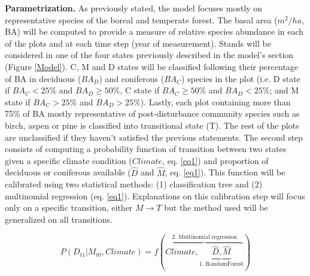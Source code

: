 \textbf{Parametrization.} As previously stated, the model focuses mostly on
representative species of the boreal and temperate forest. The basal area
($m^2/ha$, BA) will be computed to provide a measure of relative species
abundance in each of the plots and at each time step (year of measurement).
Stands will be considered in one of the four states previously described in
the model's section (Figure \ref{Model}). C, M and D states will be classified
following their percentage of BA in deciduous ($BA_D$) and coniferous ($BA_C$)
species in the plot (i.e. D state if $BA_C < 25\%$ and $BA_D \geq 50\%$, C
state if ${BA}_C \geq 50\%$ and $BA_D < 25\%$; and M state if $BA_C > 25\%$
and $BA_D > 25\%$). Lastly, each plot containing more than 75\% of BA mostly
representative of post-disturbance community species such as birch, aspen or
pine is classified into transitional state (T). The rest of the plots are
unclassified if they haven't satisfied the previous statements. The second
step consists of computing a probability function of transition between two
states given a specific climate condition ($Climate$, eq. \ref{eq1}) and
proportion of deciduous or coniferous available ($\hat{D}$ and $\hat{M}$, eq.
\ref{eq1}). This function will be calibrated using two statistical methods:
(1) classification tree and (2) multinomial regression (eq. \ref{eq1}).
Explanations on this calibration step will focus only on a specific
transition, either $M \rightarrow T$ but the method used will be generalized
on all transitions.

\begin{equation}
	P(D_{t1}|M_{t0}, Climate) = f(\overbrace{Climate, \underbrace{\hat{D}, \hat{M}}_\text{1. RandomForest}}^\text{2. Multinomial regression})
\label{eq1}
\end{equation}


